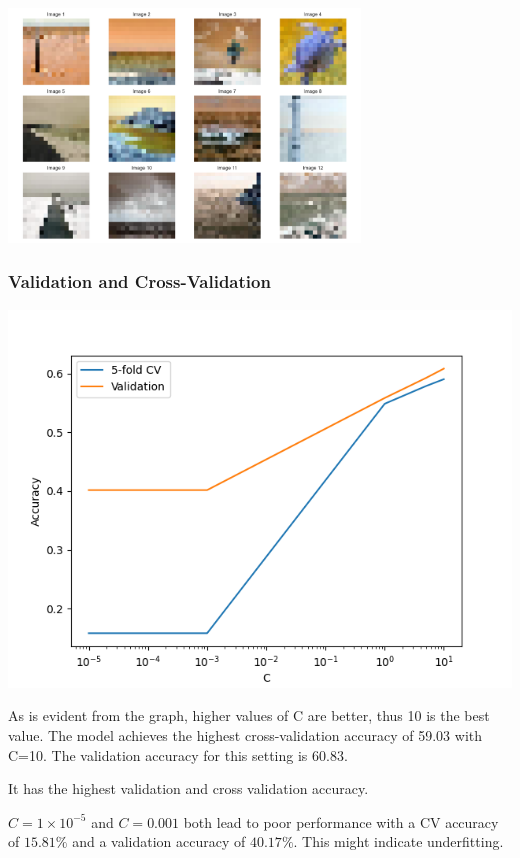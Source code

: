 \documentclass[12pt,a4paper]{article}
\begin{document}
\includegraphics[width=0.7\textwidth]{Assignment 2/q2/misclassified_4_2.png}

\subsubsection{Validation and Cross-Validation}
\includegraphics[width=\textwidth]{Assignment 2/q2/cross_validation_mult real.png}

As is evident from the graph, higher values of C are better, thus 10 is the best value. 
The model achieves the highest cross-validation accuracy of 59.03 with C=10. The validation accuracy for this setting is 60.83.

It has the highest validation and cross validation accuracy. 

\( C = 1 \times 10^{-5} \) and \( C = 0.001 \) both lead to poor performance with a CV accuracy of \( 15.81\% \) and a validation accuracy of \( 40.17\% \). This might indicate underfitting.
\end{document}
